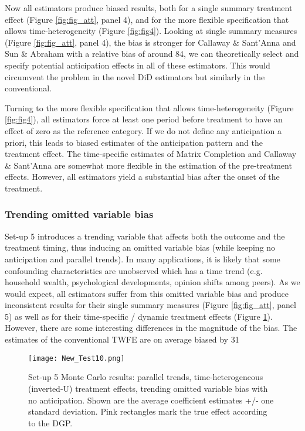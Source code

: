 Now all estimators produce biased results, both for a single summary treatment effect (Figure \ref{fig:fig_att}, panel 4), and for the more flexible specification that allows time-heterogeneity (Figure \ref{fig:fig4}). Looking at single summary measures (Figure \ref{fig:fig_att}, panel 4), the bias is stronger for Callaway \& Sant'Anna and Sun \& Abraham with a relative bias of around 84\Obviously, we can theoretically select and specify potential anticipation effects in all of these estimators. This would circumvent the problem in the novel DiD estimators but similarly in the conventional.

Turning to the more flexible specification that allows time-heterogeneity (Figure \ref{fig:fig4}), all estimators force at least one period before treatment to have an effect of zero as the reference category. If we do not define any anticipation a priori, this leads to biased estimates of the anticipation pattern and the treatment effect. The time-specific estimates of Matrix Completion and Callaway \& Sant'Anna are somewhat more flexible in the estimation of the pre-treatment effects. However, all estimators yield a substantial bias after the onset of the treatment. 


\subsubsection{Trending omitted variable bias}

Set-up 5 introduces a trending variable that affects both the outcome and the treatment timing, thus inducing an omitted variable bias (while keeping no anticipation and parallel trends). In many applications, it is likely that some confounding characteristics are unobserved which has a time trend (e.g. household wealth, psychological developments, opinion shifts among peers). As we would expect, all estimators suffer from this omitted variable bias and produce inconsistent results for their single summary measures (Figure \ref{fig:fig_att}, panel 5) as well as for their time-specific / dynamic treatment effects (Figure \ref{fig:fig6}). However, there are some interesting differences in the magnitude of the bias. The estimates of the conventional TWFE are on average biased by 31\
\begin{figure}[t]    \texttt{[image: New\_Test10.png]} 
    \caption{Set-up 5 Monte Carlo results: parallel trends, time-heterogeneous (inverted-U) treatment effects, trending omitted variable bias with no anticipation. Shown are the average coefficient estimates +/- one standard deviation. Pink rectangles mark the true effect according to the DGP.}    \label{fig:fig6}    \hypertarget{fig:fig6}{}\end{figure}


